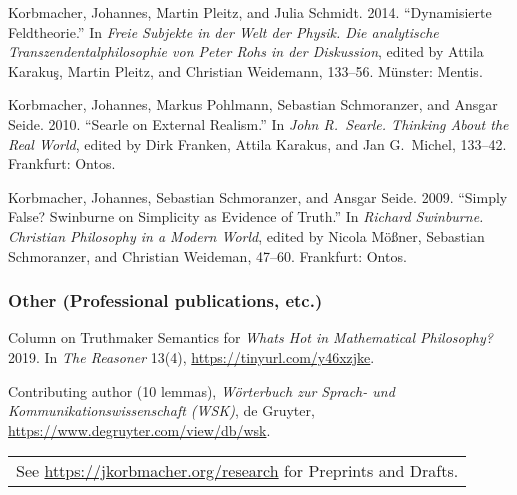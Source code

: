 \begin{etaremune}
  \item Korbmacher, Johannes, Martin Pleitz, and Julia Schmidt. 2014. ``Dynamisierte Feldtheorie.'' In \emph{Freie Subjekte in der Welt der Physik. Die analytische Transzendentalphilosophie von Peter Rohs in der Diskussion}, edited by Attila Karaku\c{s}, Martin Pleitz, and Christian Weidemann, 133--56. M\"unster: Mentis.
  \item Korbmacher, Johannes, Markus Pohlmann, Sebastian Schmoranzer, and Ansgar Seide. 2010. ``Searle on External Realism.'' In \emph{John R.\ Searle. Thinking About the Real World}, edited by Dirk Franken, Attila Karakus, and Jan G.\ Michel, 133--42. Frankfurt: Ontos.
  \item Korbmacher, Johannes, Sebastian Schmoranzer, and Ansgar Seide. 2009. ``Simply False? Swinburne on Simplicity as Evidence of Truth.'' In \emph{Richard Swinburne. Christian Philosophy in a Modern World}, edited by Nicola M\"o\ss ner, Sebastian Schmoranzer, and Christian Weideman, 47--60. Frankfurt: Ontos.
\end{etaremune}
\subsubsection*{Other (Professional publications, etc.)}
\begin{etaremune}
  \item Column on Truthmaker Semantics for \emph{Whats Hot in Mathematical Philosophy?} 2019. In \emph{The Reasoner} 13(4), \url{https://tinyurl.com/y46xzjke}.
  \item Contributing author (10 lemmas), \emph{W\"orterbuch zur Sprach- und Kommunikationswissenschaft (WSK)}, de Gruyter, \url{https://www.degruyter.com/view/db/wsk}.
\end{etaremune} \vspace{1ex}
\begin{tabular}{l} See \url{https://jkorbmacher.org/research} for Preprints and Drafts.
\end{tabular}
